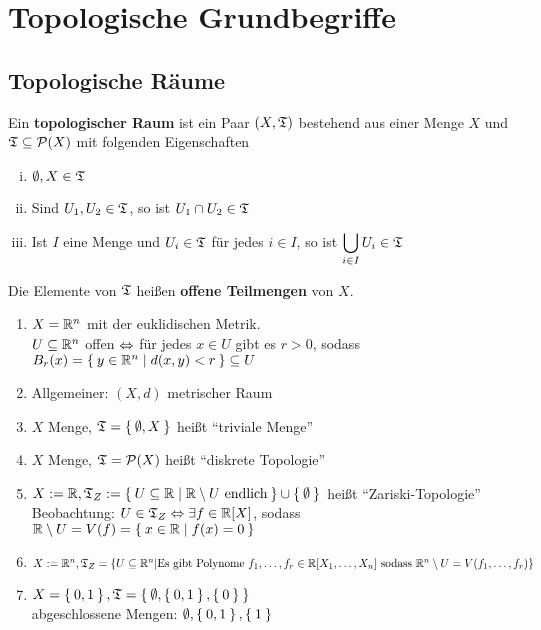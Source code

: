 \chapter{Topologische Grundbegriffe}
\section{Topologische Räume}
\begin{definition}  
    Ein \textbf{topologischer Raum} ist ein Paar $(X, \mathfrak{T})$ bestehend
    aus einer Menge $X$ und $\mathfrak{T} \subseteq \mathcal{P}(X)$ mit
    folgenden Eigenschaften
    \begin{enumerate}[(i)]
        \item $\emptyset, X \in \mathfrak{T}$
        \item Sind $U_1, U_2 \in \mathfrak{T}$, so ist $U_1 \cap U_2 \in \mathfrak{T}$
        \item Ist $I$ eine Menge und $U_i \in \mathfrak{T}$ für jedes $i \in I$,
              so ist $\displaystyle \bigcup_{i \in I} U_i \in \mathfrak{T}$
    \end{enumerate}
    Die Elemente von $\mathfrak{T}$ heißen \textbf{offene Teilmengen} von $X$. 
\end{definition}

\begin{beispieleX}
    \begin{enumerate}[1)]
        \item $X = \mathbb{R}^n$ mit der euklidischen Metrik.\\
              $U \subseteq \mathbb{R}^n$ offen $\Leftrightarrow$ für jedes $x \in U$ 
              gibt es $r > 0$, sodass $B_r(x) = \Set{y \in \ensuremath{\mathbb{R}}^n | d(x,y) < r} \subseteq U$
        \item Allgemeiner: $(X, d)$ metrischer Raum
        \item $X$ Menge, $\mathfrak{T} = \Set{\emptyset, X}$ heißt \enquote{triviale Menge} 
        \item $X$ Menge, $\mathfrak{T} = \mathcal{P}(X)$ heißt \enquote{diskrete Topologie} 
        \item $X :=\mathbb{R}, \mathfrak{T}_Z := \Set{U \subseteq \ensuremath{\mathbb{R}}| \ensuremath{\mathbb{R}}\setminus U \text{ endlich}} \cup \Set{\emptyset}$ heißt \enquote{Zariski-Topologie} \\
              Beobachtung: $U \in \mathfrak{T}_Z \Leftrightarrow \exists f \in \mathbb{R}[X]$, sodass $\mathbb{R} \setminus U = V(f) = \Set{x \in \ensuremath{\mathbb{R}}| f(x) = 0}$
        \item $X := \mathbb{R}^n, \mathfrak{T}_Z = \{U \subseteq \mathbb{R}^n | \text{Es gibt Polynome } f_1, \dots, f_r \in \mathbb{R}[X_1, \dots, X_n] \text{ sodass }\\\mathbb{R}^n \setminus U = V(f_1, \dots, f_r)\}$
        \item $X = \Set{0,1}, \mathfrak{T} = \Set{\emptyset, \Set{0,1}, \Set{0}}$\\
              abgeschlossene Mengen: $\emptyset, \Set{0,1}, \Set{1}$
    \end{enumerate}
\end{beispieleX}

